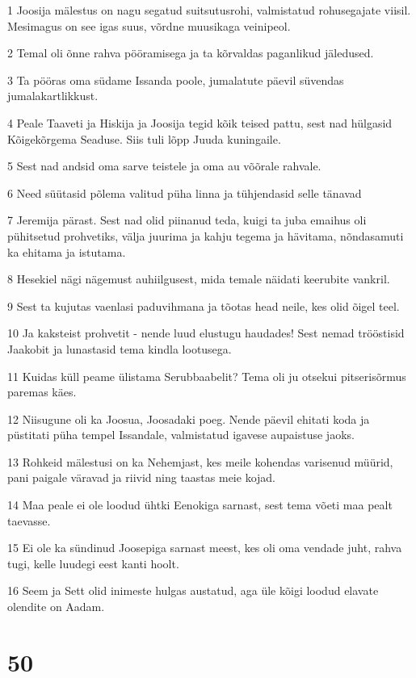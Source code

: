\par 1 Joosija mälestus on nagu segatud suitsutusrohi, valmistatud rohusegajate viisil. Mesimagus on see igas suus, võrdne muusikaga veinipeol.
\par 2 Temal oli õnne rahva pööramisega ja ta kõrvaldas paganlikud jäledused.
\par 3 Ta pööras oma südame Issanda poole, jumalatute päevil süvendas jumalakartlikkust.
\par 4 Peale Taaveti ja Hiskija ja Joosija tegid kõik teised pattu, sest nad hülgasid Kõigekõrgema Seaduse. Siis tuli lõpp Juuda kuningaile.
\par 5 Sest nad andsid oma sarve teistele ja oma au võõrale rahvale.
\par 6 Need süütasid põlema valitud püha linna ja tühjendasid selle tänavad
\par 7 Jeremija pärast. Sest nad olid piinanud teda, kuigi ta juba emaihus oli pühitsetud prohvetiks, välja juurima ja kahju tegema ja hävitama, nõndasamuti ka ehitama ja istutama.
\par 8 Hesekiel nägi nägemust auhiilgusest, mida temale näidati keerubite vankril.
\par 9 Sest ta kujutas vaenlasi paduvihmana ja tõotas head neile, kes olid õigel teel.
\par 10 Ja kaksteist prohvetit - nende luud elustugu haudades! Sest nemad trööstisid Jaakobit ja lunastasid tema kindla lootusega.
\par 11 Kuidas küll peame ülistama Serubbaabelit? Tema oli ju otsekui pitserisõrmus paremas käes.
\par 12 Niisugune oli ka Joosua, Joosadaki poeg. Nende päevil ehitati koda ja püstitati püha tempel Issandale, valmistatud igavese aupaistuse jaoks.
\par 13 Rohkeid mälestusi on ka Nehemjast, kes meile kohendas varisenud müürid, pani paigale väravad ja riivid ning taastas meie kojad.
\par 14 Maa peale ei ole loodud ühtki Eenokiga sarnast, sest tema võeti maa pealt taevasse.
\par 15 Ei ole ka sündinud Joosepiga sarnast meest, kes oli oma vendade juht, rahva tugi, kelle luudegi eest kanti hoolt.
\par 16 Seem ja Sett olid inimeste hulgas austatud, aga üle kõigi loodud elavate olendite on Aadam.

\chapter{50}

